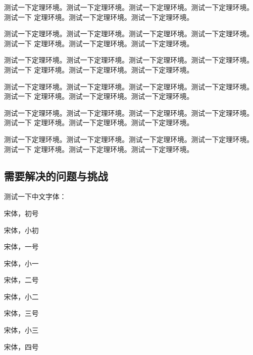 \begin{assumption}
测试一下定理环境。测试一下定理环境。测试一下定理环境。测试一下定理环境。测试一下
定理环境。测试一下定理环境。测试一下定理环境。
\end{assumption}

\begin{conjecture}
测试一下定理环境。测试一下定理环境。测试一下定理环境。测试一下定理环境。测试一下
定理环境。测试一下定理环境。测试一下定理环境。
\end{conjecture}

\begin{axiom}
测试一下定理环境。测试一下定理环境。测试一下定理环境。测试一下定理环境。测试一下
定理环境。测试一下定理环境。测试一下定理环境。
\end{axiom}


\begin{problem}
测试一下定理环境。测试一下定理环境。测试一下定理环境。测试一下定理环境。测试一下
定理环境。测试一下定理环境。测试一下定理环境。
\end{problem}

\begin{exercise}
测试一下定理环境。测试一下定理环境。测试一下定理环境。测试一下定理环境。测试一下
定理环境。测试一下定理环境。测试一下定理环境。
\end{exercise}


\begin{algorithm}
测试一下定理环境。测试一下定理环境。测试一下定理环境。测试一下定理环境。测试一下
定理环境。测试一下定理环境。测试一下定理环境。
\end{algorithm}


\subsection{需要解决的问题与挑战}

测试一下中文字体：

{\songti{} 宋体，初号}

{\songti{} 宋体，小初}

{\songti{} 宋体，一号}

{\songti{} 宋体，小一}

{\songti{} 宋体，二号}

{\songti{} 宋体，小二}

{\songti{} 宋体，三号}

{\songti{} 宋体，小三}

{\songti{} 宋体，四号}


